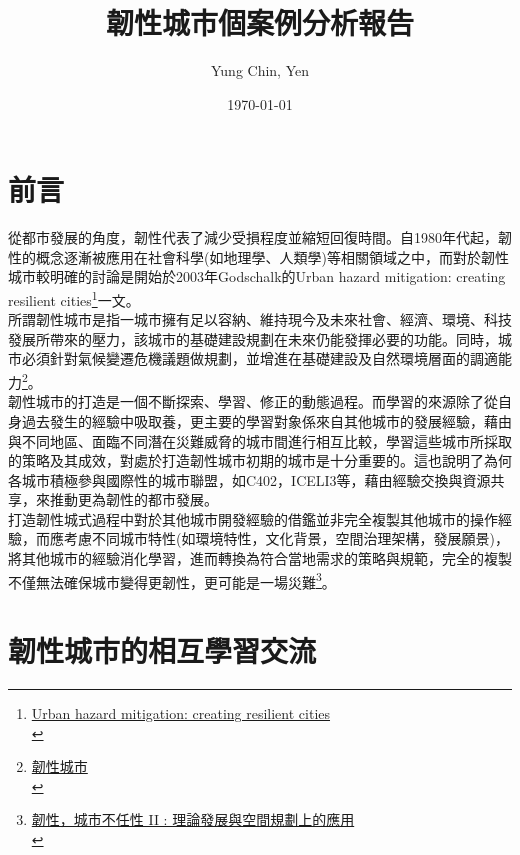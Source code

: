 \documentclass[a4paper,12pt]{article}
\author{Yung Chin, Yen}
\date{\today}
\title{韌性城市個案例分析報告}
\begin{document}
\maketitle
\tableofcontents


\section{前言}
\label{sec:org410550f}

從都市發展的角度，韌性代表了減少受損程度並縮短回復時間。自1980年代起，韌性的概念逐漸被應用在社會科學(如地理學、人類學)等相關領域之中，而對於韌性城市較明確的討論是開始於2003年Godschalk的Urban hazard mitigation: creating resilient cities\footnote{\href{https://www.google.com/url?sa=t\&rct=j\&q=\&esrc=s\&source=web\&cd=\&ved=2ahUKEwjRxsnV27HvAhVzNKYKHSaxDwIQFjADegQIBhAD\&url=https\%3A\%2F\%2Fweb.ntpu.edu.tw\%2F\~slchan\%2Ffile\_old\%2F1\_6.pdf\&usg=AOvVaw1s7kZBhbLaYSAx6XBRwm7P}{Urban hazard mitigation: creating resilient cities}\\}一文。\\

所謂韌性城市是指一城市擁有足以容納、維持現今及未來社會、經濟、環境、科技發展所帶來的壓力，該城市的基礎建設規劃在未來仍能發揮必要的功能。同時，城市必須針對氣候變遷危機議題做規劃，並增進在基礎建設及自然環境層面的調適能力\footnote{\href{https://wiki.mbalib.com/zh-tw/\%E9\%9F\%A7\%E6\%80\%A7\%E5\%9F\%8E\%E5\%B8\%82}{韌性城市}\\\label{orgaec2c31}}。\\

韌性城市的打造是一個不斷探索、學習、修正的動態過程。而學習的來源除了從自身過去發生的經驗中吸取養，更主要的學習對象係來自其他城市的發展經驗，藉由與不同地區、面臨不同潛在災難威脅的城市間進行相互比較，學習這些城市所採取的策略及其成效，對處於打造韌性城市初期的城市是十分重要的。這也說明了為何各城市積極參與國際性的城市聯盟，如C402，ICELI3等，藉由經驗交換與資源共享，來推動更為韌性的都市發展。\\

打造韌性城式過程中對於其他城市開發經驗的借鑑並非完全複製其他城市的操作經驗，而應考慮不同城市特性(如環境特性，文化背景，空間治理架構，發展願景)，將其他城市的經驗消化學習，進而轉換為符合當地需求的策略與規範，完全的複製不僅無法確保城市變得更韌性，更可能是一場災難\footnote{\href{https://eyesonplace.net/2016/05/11/2201/}{韌性，城市不任性 II : 理論發展與空間規劃上的應用}\\}。\\
\newpage

\section{韌性城市的相互學習交流}
\label{sec:orgad63825}
\end{document}
